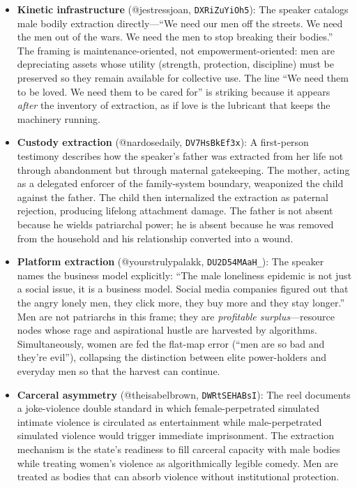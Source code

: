 \documentclass[12pt]{article}
\begin{document}
\begin{itemize}
  \item \textbf{Kinetic infrastructure} (@jestressjoan, \texttt{DXRiZuYiOh5}): The speaker catalogs male bodily extraction directly---``We need our men off the streets. We need the men out of the wars. We need the men to stop breaking their bodies.'' The framing is maintenance-oriented, not empowerment-oriented: men are depreciating assets whose utility (strength, protection, discipline) must be preserved so they remain available for collective use. The line ``We need them to be loved. We need them to be cared for'' is striking because it appears \textit{after} the inventory of extraction, as if love is the lubricant that keeps the machinery running.
  
  \item \textbf{Custody extraction} (@nardosedaily, \texttt{DV7HsBkEf3x}): A first-person testimony describes how the speaker's father was extracted from her life not through abandonment but through maternal gatekeeping. The mother, acting as a delegated enforcer of the family-system boundary, weaponized the child against the father. The child then internalized the extraction as paternal rejection, producing lifelong attachment damage. The father is not absent because he wields patriarchal power; he is absent because he was removed from the household and his relationship converted into a wound.
  
  \item \textbf{Platform extraction} (@yourstrulypalakk, \texttt{DU2D54MAaH\_}): The speaker names the business model explicitly: ``The male loneliness epidemic is not just a social issue, it is a business model. Social media companies figured out that the angry lonely men, they click more, they buy more and they stay longer.'' Men are not patriarchs in this frame; they are \textit{profitable surplus}---resource nodes whose rage and aspirational hustle are harvested by algorithms. Simultaneously, women are fed the flat-map error (``men are so bad and they're evil''), collapsing the distinction between elite power-holders and everyday men so that the harvest can continue.
  
  \item \textbf{Carceral asymmetry} (@theisabelbrown, \texttt{DWRtSEHABsI}): The reel documents a joke-violence double standard in which female-perpetrated simulated intimate violence is circulated as entertainment while male-perpetrated simulated violence would trigger immediate imprisonment. The extraction mechanism is the state's readiness to fill carceral capacity with male bodies while treating women's violence as algorithmically legible comedy. Men are treated as bodies that can absorb violence without institutional protection.
\end{itemize}
\end{document}
